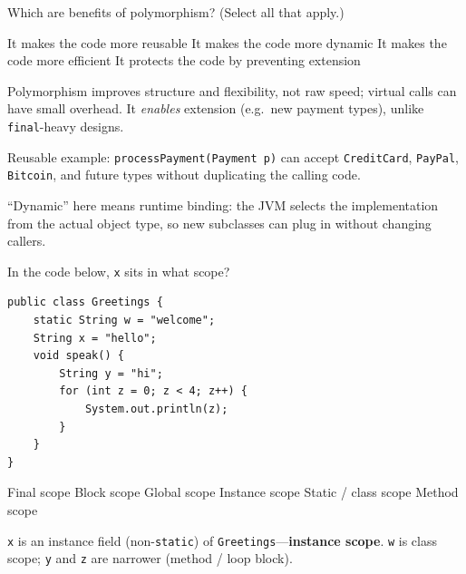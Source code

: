 \question[4]
Which are benefits of polymorphism? (Select all that apply.)
\begin{checkboxes}
  \CorrectChoice It makes the code more reusable
  \CorrectChoice It makes the code more dynamic
  \choice It makes the code more efficient
  \choice It protects the code by preventing extension
\end{checkboxes}
\begin{solution}
  Polymorphism improves structure and flexibility, not raw speed; virtual calls can have small overhead. It \emph{enables} extension (e.g.\ new payment types), unlike \texttt{final}-heavy designs.

  Reusable example: \texttt{processPayment(Payment p)} can accept \texttt{CreditCard}, \texttt{PayPal}, \texttt{Bitcoin}, and future types without duplicating the calling code.

  ``Dynamic'' here means runtime binding: the JVM selects the implementation from the actual object type, so new subclasses can plug in without changing callers.
\end{solution}

\newpage


\question[4]
In the code below, \texttt{x} sits in what scope?
\begin{lstlisting}[style=java]
public class Greetings {
    static String w = "welcome";
    String x = "hello";
    void speak() {
        String y = "hi";
        for (int z = 0; z < 4; z++) {
            System.out.println(z);
        }
    }
}
\end{lstlisting}
\begin{choices}
  \choice Final scope
  \choice Block scope
  \choice Global scope
  \CorrectChoice Instance scope
  \choice Static / class scope
  \choice Method scope
\end{choices}
\begin{solution}
  \texttt{x} is an instance field (non-\texttt{static}) of \texttt{Greetings}---\textbf{instance scope}. \texttt{w} is class scope; \texttt{y} and \texttt{z} are narrower (method / loop block).
\end{solution}

